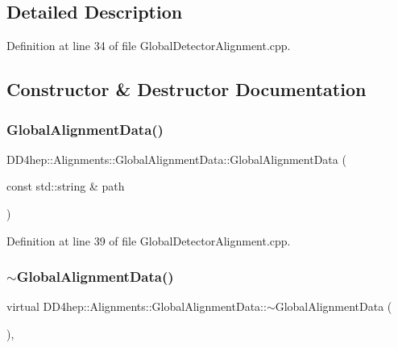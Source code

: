 \subsection{Detailed Description}


Definition at line 34 of file Global\+Detector\+Alignment.\+cpp.



\subsection{Constructor \& Destructor Documentation}
\hypertarget{class_d_d4hep_1_1_alignments_1_1_global_alignment_data_a57af2014192d0c3f26c8b47b7963236a}{}\label{class_d_d4hep_1_1_alignments_1_1_global_alignment_data_a57af2014192d0c3f26c8b47b7963236a} 
\subsubsection{\texorpdfstring{Global\+Alignment\+Data()}{GlobalAlignmentData()}}
{\footnotesize\ttfamily D\+D4hep\+::\+Alignments\+::\+Global\+Alignment\+Data\+::\+Global\+Alignment\+Data (\begin{DoxyParamCaption}\item[{const std\+::string \&}]{path }\end{DoxyParamCaption})\hspace{0.3cm}{\ttfamily [inline]}}



Definition at line 39 of file Global\+Detector\+Alignment.\+cpp.

\hypertarget{class_d_d4hep_1_1_alignments_1_1_global_alignment_data_aa835825012b4775e2cd9d6f286271533}{}\label{class_d_d4hep_1_1_alignments_1_1_global_alignment_data_aa835825012b4775e2cd9d6f286271533} 
\subsubsection{\texorpdfstring{$\sim$\+Global\+Alignment\+Data()}{~GlobalAlignmentData()}}
{\footnotesize\ttfamily virtual D\+D4hep\+::\+Alignments\+::\+Global\+Alignment\+Data\+::$\sim$\+Global\+Alignment\+Data (\begin{DoxyParamCaption}{ }\end{DoxyParamCaption})\hspace{0.3cm}{\ttfamily [inline]}, {\ttfamily [virtual]}}



